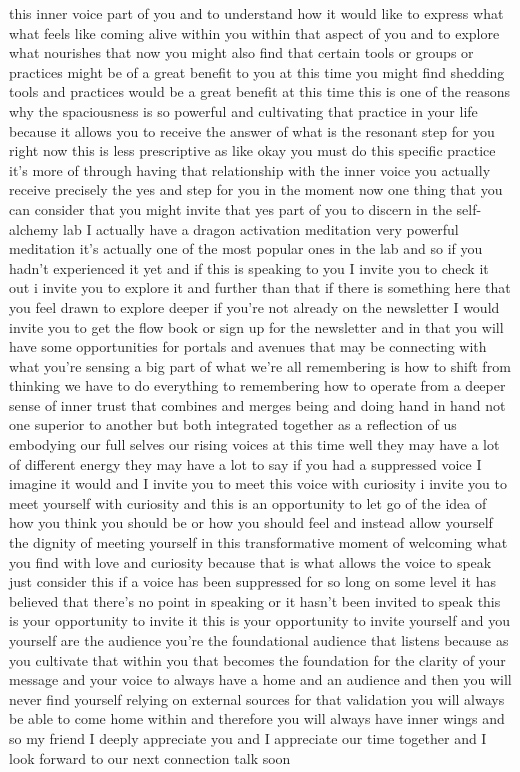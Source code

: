 \documentclass{article}
\begin{document}
this inner voice part of you and to understand how it would like to express what what feels like coming alive within you within that aspect of you and to explore what nourishes that now you might also find that certain tools or groups or practices might be of a great benefit to you at this time you might find shedding tools and practices would be a great benefit at this time this is one of the reasons why the spaciousness is so powerful and cultivating that practice in your life because it allows you to receive the answer of what is the resonant step for you right now this is less prescriptive as like okay you must do this specific practice it's more of through having that relationship with the inner voice you actually receive precisely the yes and step for you in the moment now one thing that you can consider that you might invite that yes part of you to discern in the self-alchemy lab I actually have a dragon activation meditation very powerful meditation it's actually one of the most popular ones in the lab and so if you hadn't experienced it yet and if this is speaking to you I invite you to check it out i invite you to explore it and further than that if there is something here that you feel drawn to explore deeper if you're not already on the newsletter I would invite you to get the flow book or sign up for the newsletter and in that you will have some opportunities for portals and avenues that may be connecting with what you're sensing a big part of what we're all remembering is how to shift from thinking we have to do everything to remembering how to operate from a deeper sense of inner trust that combines and merges being and doing hand in hand not one superior to another but both integrated together as a reflection of us embodying our full selves our rising voices at this time well they may have a lot of different energy they may have a lot to say if you had a suppressed voice I imagine it would and I invite you to meet this voice with curiosity i invite you to meet yourself with curiosity and this is an opportunity to let go of the idea of how you think you should be or how you should feel and instead allow yourself the dignity of meeting yourself in this transformative moment of welcoming what you find with love and curiosity because that is what allows the voice to speak just consider this if a voice has been suppressed for so long on some level it has believed that there's no point in speaking or it hasn't been invited to speak this is your opportunity to invite it this is your opportunity to invite yourself and you yourself are the audience you're the foundational audience that listens because as you cultivate that within you that becomes the foundation for the clarity of your message and your voice to always have a home and an audience and then you will never find yourself relying on external sources for that validation you will always be able to come home within and therefore you will always have inner wings and so my friend I deeply appreciate you and I appreciate our time together and I look forward to our next connection talk soon
\end{document}

